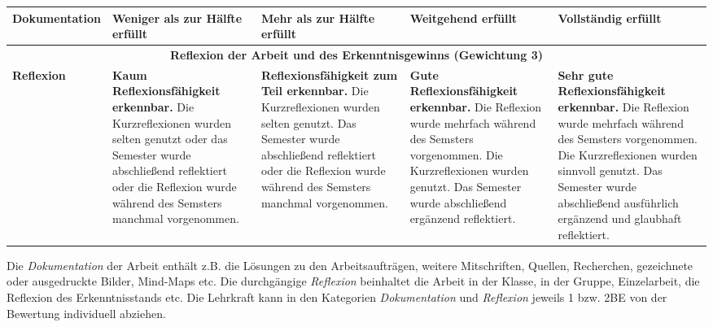 \documentclass{scrartcl}  %
\begin{document}
\begin{landscape}
\begin{tabular}{|l|*{4}{p{4.5cm}|}}
							\hline
							\textbf{Dokumentation} &
							Weniger als zur Hälfte erfüllt &
							Mehr als zur Hälfte erfüllt &
							Weitgehend erfüllt &
							Vollständig erfüllt \\
							\hline
							\multicolumn{5}{c}{\textbf{Reflexion der Arbeit und des Erkenntnisgewinns (Gewichtung 3)}} \\
							\hline
							\textbf{Reflexion} &
							\textbf{Kaum Reflexionsfähigkeit erkennbar.} Die Kurzreflexionen wurden selten genutzt oder das Semester wurde abschließend reflektiert oder die Reflexion wurde während des Semsters manchmal vorgenommen. &
							\textbf{Reflexionsfähigkeit zum Teil erkennbar.} Die Kurzreflexionen wurden selten genutzt. Das Semester wurde abschließend reflektiert oder die Reflexion wurde während des Semsters manchmal vorgenommen. &
							\textbf{Gute Reflexionsfähigkeit erkennbar.} Die Reflexion wurde mehrfach während des Semsters vorgenommen. Die Kurzreflexionen wurden genutzt. Das Semester wurde abschließend ergänzend reflektiert.  &
							\textbf{Sehr gute Reflexionsfähigkeit erkennbar.} Die Reflexion wurde mehrfach während des Semsters vorgenommen. Die Kurzreflexionen wurden sinnvoll genutzt. Das Semester wurde abschließend ausführlich ergänzend und glaubhaft reflektiert. \\
							\hline
						\end{tabular} \newline
						
						\vspace{1cm}
						
						\noindent Die \textit{Dokumentation} der Arbeit enthält z.B. die Lösungen zu den Arbeitsaufträgen, weitere Mitschriften, Quellen, Recherchen, gezeichnete oder ausgedruckte Bilder, Mind-Maps etc. \newline
						Die durchgängige \textit{Reflexion} beinhaltet die Arbeit in der Klasse, in der Gruppe, Einzelarbeit, die Reflexion des Erkenntnisstands etc. \newline
						Die Lehrkraft kann in den Kategorien \textit{Dokumentation} und \textit{Reflexion} jeweils 1 bzw. 2BE von der Bewertung individuell abziehen.
						
						\end{landscape}
			
			
\end{document}
